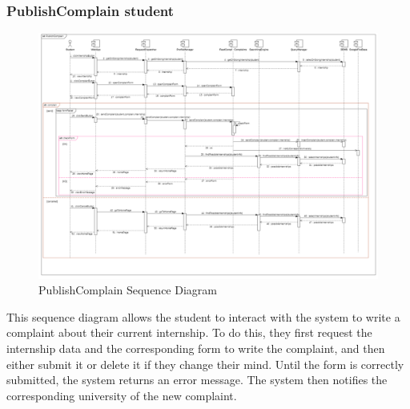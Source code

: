 \documentclass{article}
\begin{document}
\subsubsection{PublishComplain student}
\begin{figure}[H]
    \centering
    \includegraphics[width=1\linewidth]{SequenceDiagram/PublComplSD.png}
    \caption{PublishComplain Sequence Diagram}
    \label{fig:enter-label}
\end{figure}
This sequence diagram allows the student to interact with the system to write a complaint about their current internship. To do this, they first request the internship data and the corresponding form to write the complaint, and then either submit it or delete it if they change their mind. Until the form is correctly submitted, the system returns an error message. The system then notifies the corresponding university of the new complaint. 
\end{document}
